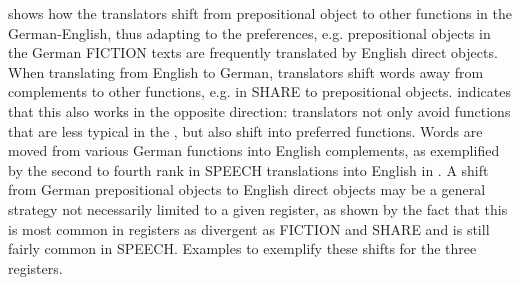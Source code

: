 \documentclass[output=paper]{LSP/langsci}
\begin{document}
\begin{table}
\caption{The ten most frequent crossing lines per register and translation direction}
\label{tab:culo:4}
\end{table}


 shows how the translators shift from prepositional object to other functions in the  German-English, thus adapting to the  preferences, e.g. prepositional objects in the German FICTION texts are frequently translated by English direct objects. When translating from English to German, translators shift words away from complements to other functions, e.g. in SHARE to prepositional objects.  indicates that this also works in the opposite direction: translators not only avoid functions that are less typical in the , but also shift into preferred functions. Words are moved from various German functions into English complements, as exemplified by the second to fourth rank in SPEECH translations into English in . A shift from German prepositional objects to English direct objects may be a general strategy not necessarily limited to a given register, as shown by the fact that this  is most common in registers as divergent as FICTION and SHARE and is still fairly common in SPEECH. Examples  to  exemplify these shifts for the three registers.
\end{document}
